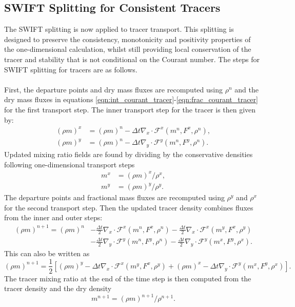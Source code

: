 \documentclass{ametsocV6.1}
\begin{document}
\subsection{SWIFT Splitting for Consistent Tracers} \label{sec:swift_tracer}
The SWIFT splitting is now applied to tracer transport.
This splitting is designed to preserve the consistency, monotonicity and positivity properties of the one-dimensional calculation, whilst still providing local conservation of the tracer and stability that is not conditional on the Courant number.
The steps for SWIFT splitting for tracers are as follows. \\
\\
First, the departure points and dry mass fluxes are recomputed using $\rho^n$ and the dry mass fluxes in equations \eqref{eqn:int_courant_tracer}-\eqref{eqn:frac_courant_tracer} for the first transport step.
The inner transport step for the tracer is then given by:
\begin{subequations}
\begin{align}  \label{eqn:swift_split_1}   
        (\rho m)^x &= (\rho m)^n - \Delta{t} \nabla_x\cdot \mathcal{F}^x(m^n,F^{x},\rho^n), \\ \label{eqn:swift_split_2}
        (\rho m)^y &= (\rho m)^n - \Delta{t} \nabla_y\cdot \mathcal{F}^y(m^n,F^{y},\rho^n).
\end{align}
\end{subequations}
Updated mixing ratio fields are found by dividing by the conservative densities following one-dimensional transport steps
\begin{subequations}
\begin{align}
m^x &= (\rho m)^x / \rho^x, \\
m^y &= (\rho m)^y / \rho^y.
\end{align}
\end{subequations}
The departure points and fractional mass fluxes are recomputed using $\rho^y$ and $\rho^x$ for the second transport step.
Then the updated tracer density combines fluxes from the inner and outer steps:
\begin{equation} \label{eqn:swift_tracer}
\begin{split}
(\rho m)^{n+1} = (\rho m)^n & -\frac{\Delta{t}}{2}\nabla_x\cdot \mathcal{F}^x(m^n,F^{x},\rho^n) -\frac{\Delta{t}}{2}\nabla_x\cdot \mathcal{F}^x(m^y,F^{x},\rho^y) \\
        & - \frac{\Delta{t}}{2}\nabla_y\cdot \mathcal{F}^y(m^n,F^{y},\rho^n) -\frac{\Delta{t}}{2}\nabla_y\cdot \mathcal{F}^y(m^x,F^{y},\rho^x).
\end{split}
\end{equation}
This can also be written as
\begin{equation}
(\rho m)^{n+1} = \frac{1}{2}\left[(\rho m)^y - \Delta t \nabla_x\cdot \mathcal{F}^x(m^y,F^{x},\rho^y) + (\rho m)^x - \Delta t \nabla_y\cdot \mathcal{F}^y(m^x,F^{y},\rho^x) \right].
\end{equation}
The tracer mixing ratio at the end of the time step is then computed from the tracer density and the dry density
\begin{equation}
    m^{n+1} = (\rho m)^{n+1} / \rho^{n+1}.
\end{equation}
\end{document}
